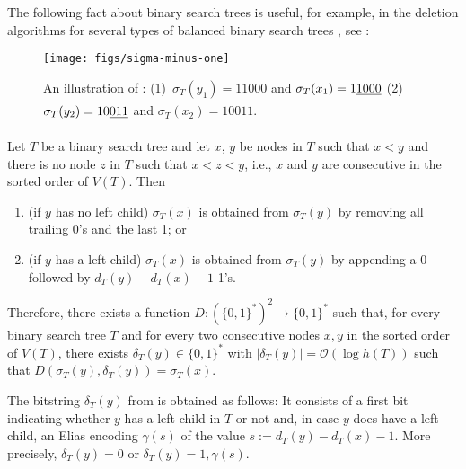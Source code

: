 \documentclass[10pt, conference, compsocconf]{IEEEtran}
\newcommand{\Oh}{\mathcal{O}}
\let\le\leqslant
\begin{document}

The following fact about binary search trees is useful, for example, in the deletion algorithms for several types of balanced binary search trees \cite[Section~6.2.3]{morin:open}, see :

\begin{figure}
  \begin{center}
    \texttt{[image: figs/sigma-minus-one]}
  \end{center}
  \caption{An illustration of : (1)~$\sigma_T(y_1)=11000$ and $\sigma_T(x_1)=1\mbox{\sout{1000}}$ (2)~$\sigma_T(y_2)=10\mbox{\sout{011}}$ and $\sigma_T(x_2)=10011$.}
\end{figure}

\begin{obs}
  Let $T$ be a binary search tree and let $x$, $y$ be nodes in $T$ such that $x<y$ and there is no node $z$ in $T$ such that $x<z<y$, i.e., $x$ and $y$ are consecutive in the sorted order of $V(T)$.  Then
  \begin{enumerate}
    \item (if $y$ has no left child) $\sigma_T(x)$ is obtained from $\sigma_T(y)$ by removing all trailing 0's and the last 1; or
    \item (if $y$ has a left child) $\sigma_T(x)$ is obtained from $\sigma_T(y)$ by appending a 0 followed by $d_T(y)-d_T(x)-1$ 1's.
  \end{enumerate}
Therefore, there exists a function $D:(\{0,1\}^*)^2\to\{0,1\}^*$ such that, for every binary search tree $T$ and for every two consecutive nodes $x, y$ in the sorted order of $V(T)$, there exists $\delta_T(y) \in \{0,1\}^*$ with $|\delta_T(y)|=\Oh(\log h(T))$ such that
$D(\sigma_T(y),\delta_T(y))=\sigma_T(x)$.
\end{obs}

The bitstring $\delta_T(y)$ from  is obtained as follows: It consists of a first bit indicating whether $y$ has a left child in $T$ or not and, in case $y$ does have a left child, an Elias encoding $\gamma(s)$ of the value $s:=d_T(y)-d_T(x)-1$.  More precisely, $\delta_T(y) = 0$ or $\delta_T(y) = 1, \gamma(s)$.
\end{document}
